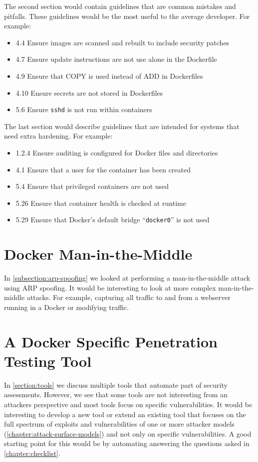 \medskip

The second section would contain guidelines that are common mistakes and pitfalls. These guidelines would be the most useful to the average developer. For example:
\begin{itemize}
    \item 4.4 Ensure images are scanned and rebuilt to include security patches
    \item 4.7 Ensure update instructions are not use alone in the Dockerfile
    \item 4.9 Ensure that COPY is used instead of ADD in Dockerfiles
    \item 4.10 Ensure secrets are not stored in Dockerfiles
    \item 5.6 Ensure \lstinline{sshd} is not run within containers
\end{itemize}

\medskip

The last section would describe guidelines that are intended for systems that need extra hardening. For example:
\begin{itemize}
    \item 1.2.4 Ensure auditing is configured for Docker files and directories
    \item 4.1 Ensure that a user for the container has been created
    \item 5.4 Ensure that privileged containers are not used
    \item 5.26 Ensure that container health is checked at runtime
    \item 5.29 Ensure that Docker's default bridge ``\lstinline{docker0}'' is not used
\end{itemize}

\section{Docker Man-in-the-Middle}
In \autoref{subsection:arp-spoofing} we looked at performing a man-in-the-middle attack using ARP spoofing. It would be interesting to look at more complex man-in-the-middle attacks. For example, capturing all traffic to and from a webserver running in a Docker or modifying traffic.

\section{A Docker Specific Penetration Testing Tool}
In \autoref{section:tools} we discuss multiple tools that automate part of security assessments. However, we see that some tools are not interesting from an attackers perspective and most tools focus on specific vulnerabilities. It would be interesting to develop a new tool or extend an existing tool that focuses on the full spectrum of exploits and vulnerabilities of one or more attacker models (\autoref{chapter:attack-surface-models}) and not only on specific vulnerabilities. A good starting point for this would be by automating answering the questions asked in \autoref{chapter:checklist}.
